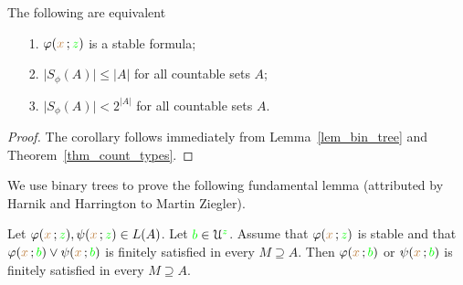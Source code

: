 \documentclass[creche.tex]{subfiles}
\begin{document}
\begin{corollary}\label{corol_count_types}
The following are equivalent
\begin{itemize}
\item[1.] $\varphi({\color{brown} x}\,;{\color{green} z})$ is a stable formula;
\item[2.] $\big|S_{\phi}(A)\big|\le|A|$ for all countable sets $A$;
\item[3.] $\big|S_{\phi}(A)\big|<2^{|A|}$ for all countable sets $A$.
\end{itemize}
\end{corollary}

\begin{proof}
  The corollary follows immediately from Lemma~\ref{lem_bin_tree} and Theorem~\ref{thm_count_types}.
\end{proof}

We use binary trees to prove the following fundamental lemma (attributed by Harnik and Harrington to Martin Ziegler).

\begin{lemma}\label{lem_ziegler}
   Let $\varphi({\color{brown} x}\,;{\color{green} z}),\psi({\color{brown} x}\,;{\color{green} z}) \in L(A)$.
   Let ${\color{green} b}\in\EuScript U^{\color{green} z}$.
   Assume that $\varphi({\color{brown} x}\,;{\color{green} z})$ is stable and that $\varphi({\color{brown} x}\,;{\color{green} b})\vee\psi({\color{brown} x}\,;{\color{green} b})$ is finitely satisfied in every $M\supseteq A$.
   Then $\varphi({\color{brown} x}\,;{\color{green} b})$ or $\psi({\color{brown} x}\,;{\color{green} b})$ is finitely satisfied in every $M\supseteq A$.
\end{lemma} 
\end{document}
